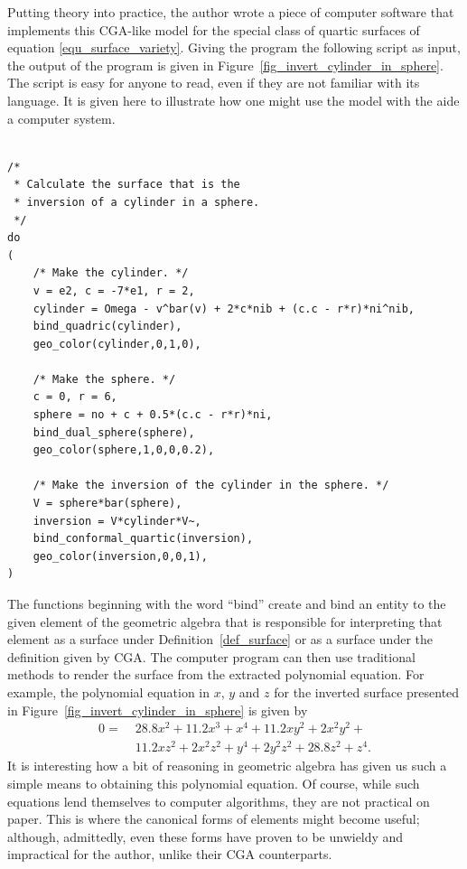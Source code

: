 \documentclass{birkjour}
\theoremstyle{definition}
\theoremstyle{remark}
\numberwithin{equation}{section}
\begin{document}
Putting theory into practice, the author wrote a piece of computer
software that implements this CGA-like model for the special class of
quartic surfaces of equation \eqref{equ_surface_variety}.  Giving the program the following
script as input, the output of the program is given in Figure~\ref{fig_invert_cylinder_in_sphere}.
The script is easy for anyone to read, even if they are not familiar with its language.  It is given
here to illustrate how one might use the model with the aide a computer system.
{\small
\begin{verbatim}

/*
 * Calculate the surface that is the
 * inversion of a cylinder in a sphere.
 */
do
(
    /* Make the cylinder. */
    v = e2, c = -7*e1, r = 2,
    cylinder = Omega - v^bar(v) + 2*c*nib + (c.c - r*r)*ni^nib,
    bind_quadric(cylinder),
    geo_color(cylinder,0,1,0),
	
    /* Make the sphere. */
    c = 0, r = 6,
    sphere = no + c + 0.5*(c.c - r*r)*ni,
    bind_dual_sphere(sphere),
    geo_color(sphere,1,0,0,0.2),
	
    /* Make the inversion of the cylinder in the sphere. */
    V = sphere*bar(sphere),
    inversion = V*cylinder*V~,
    bind_conformal_quartic(inversion),
    geo_color(inversion,0,0,1),
)

\end{verbatim}
}
The functions beginning with the word ``bind'' create and bind an entity to the given
element of the geometric algebra that is responsible for interpreting that element
as a surface under Definition~\ref{def_surface} or as a surface under the definition
given by CGA.  The computer program can then
use traditional methods to render the surface from the extracted polynomial equation.
For example, the polynomial equation in $x$, $y$ and $z$ for the inverted surface presented
in Figure~\ref{fig_invert_cylinder_in_sphere} is given by
\begin{equation}
\begin{split}
0 =\;& 28.8x^{2} + 11.2x^{3} + x^{4} + 11.2xy^{2} + 2x^{2}y^{2} + \\
 & 11.2xz^{2} + 2x^{2}z^{2} + y^{4} + 2y^{2}z^{2} + 28.8z^{2} + z^{4}.
\end{split}
\end{equation}
It is interesting how a bit of reasoning in geometric algebra has given us such a simple means
to obtaining this polynomial equation.
Of course, while such equations lend themselves to computer algorithms, they
are not practical on paper.  This is where the canonical forms of elements might become
useful; although, admittedly, even these forms have proven to be unwieldy
and impractical for the author, unlike their CGA counterparts.
\end{document}
